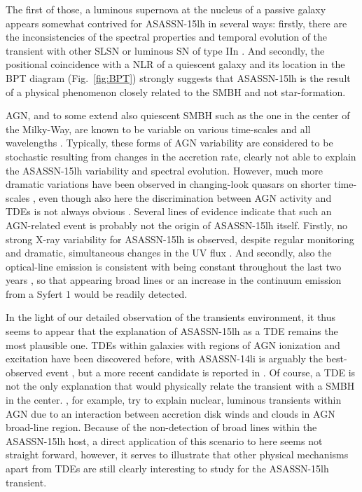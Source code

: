 \documentclass[traditabstract]{aa}
\begin{document}
The first of those, a luminous supernova at the nucleus of a passive galaxy appears somewhat contrived for ASASSN-15lh in several ways: firstly, there are the inconsistencies of the spectral properties and temporal evolution of the transient with other SLSN or luminous SN of type IIn \citep[e.g.,][and mentioned in the introduction]{2016NatAs...1E...2L}. And secondly, the positional coincidence with a NLR of a quiescent galaxy and its location in the BPT diagram (Fig.~\ref{fig:BPT}) strongly suggests that ASASSN-15lh is the result of a physical phenomenon closely related to the SMBH and not star-formation. 

AGN, and to some extend also quiescent SMBH such as the one in the center of the Milky-Way, are known to be variable on various time-scales and all wavelengths \citep[e.g.,][]{1997ARA&A..35..445U, 2001Natur.413...45B}. Typically, these forms of AGN variability are considered to be stochastic resulting from changes in the accretion rate, clearly not able to explain the ASASSN-15lh variability and spectral evolution. However, much more dramatic variations have been observed in changing-look quasars on shorter time-scales \citep[e.g.,][]{2014ApJ...788...48S, 2015ApJ...800..144L, 2017ApJ...835..144G}, even though also here the discrimination between AGN activity and TDEs is not always obvious \citep{2015MNRAS.452...69M}. Several lines of evidence indicate that such an AGN-related event is probably not the origin of ASASSN-15lh itself. Firstly, no strong X-ray variability for ASASSN-15lh is observed, despite regular monitoring and dramatic, simultaneous changes in the UV flux \citep{2016ApJ...828....3B, 2017ApJ...836...25M}. And secondly, also the optical-line emission is consistent with being constant throughout the last two years \citep{2016NatAs...1E...2L}, so that appearing broad lines or an increase in the continuum emission from a Syfert 1 would be readily detected.

In the light of our detailed observation of the transients environment, it thus seems to appear that the explanation of ASASSN-15lh as a TDE \citep{2016NatAs...1E...2L, 2017ApJ...836...25M} remains the most plausible one. TDEs within galaxies with regions of AGN ionization and excitation have been discovered before, with ASASSN-14li is arguably the best-observed event \citep{2016MNRAS.455.2918H, 2016ApJ...830L..32P}, but a more recent candidate is reported in \citet{2017arXiv170307816B}. Of course, a TDE is not the only explanation that would physically relate the transient with a SMBH in the center. \citet{2017arXiv170606855M}, for example, try to explain nuclear, luminous transients within AGN due to an interaction between accretion disk winds and clouds in AGN broad-line region. Because of the non-detection of broad lines within the ASASSN-15lh host, a direct application of this scenario to here seems not straight forward, however, it serves to illustrate that other physical mechanisms apart from TDEs are still clearly interesting to study for the ASASSN-15lh transient.
\end{document}
